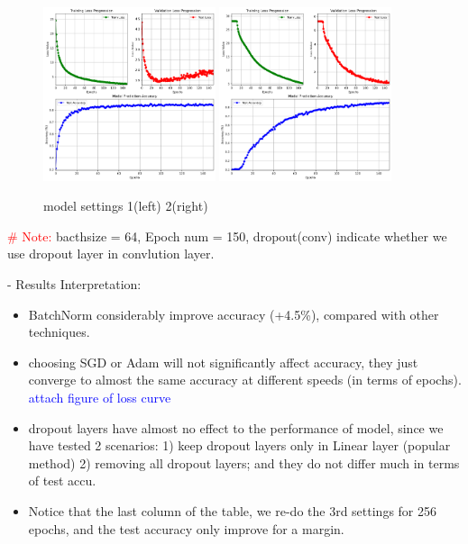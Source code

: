 \documentclass{article}
\begin{document}
\begin{figure}[htbp]
  \centering
  \includegraphics[width=0.45\textwidth]{fig/train_result_1.png} %
  \includegraphics[width=0.45\textwidth]{fig/train_result_2.png} %
  \caption{model settings 1(left) 2(right)} %
  \label{fig:curve} %
\end{figure}


\textcolor{red}{\# Note:} bacthsize = 64, Epoch num = 150, dropout(conv) indicate whether we use dropout layer in convlution layer.

\noindent - Results Interpretation: 
\begin{itemize}
  \item BatchNorm considerably improve accuracy (+4.5\%), compared with other techniques.
  \item choosing SGD or Adam will not significantly affect accuracy, they just converge to almost the same accuracy at different speeds (in terms of epochs). \textcolor{blue}{attach figure of loss curve}
  \item dropout layers have almost no effect to the performance of model, since we have tested 2 scenarios: 1) keep dropout layers only in Linear layer (popular method) 2) removing all dropout layers; and they do not differ much in terms of test accu.
  \item Notice that the last column of the table, we re-do the 3rd settings for 256 epochs, and the test accuracy only improve for a margin. 
\end{itemize}
\end{document}
